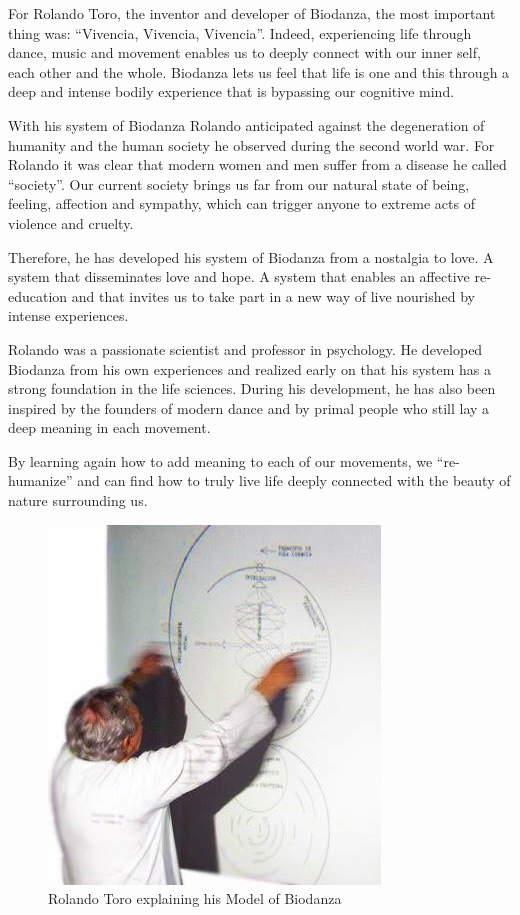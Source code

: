 \documentclass[
  11pt,
]{book}
\begin{document}
For Rolando Toro, the inventor and developer of Biodanza, the most important thing was: ``Vivencia, Vivencia, Vivencia''. Indeed, experiencing life through dance, music and movement enables us to deeply connect with our inner self, each other and the whole. Biodanza lets us feel that life is one and this through a deep and intense bodily experience that is bypassing our cognitive mind.

With his system of Biodanza Rolando anticipated against the degeneration of humanity and the human society he observed during the second world war. For Rolando it was clear that modern women and men suffer from a disease he called ``society''. Our current society brings us far from our natural state of being, feeling, affection and sympathy, which can trigger anyone to extreme acts of violence and cruelty.

Therefore, he has developed his system of Biodanza from a nostalgia to love. A system that disseminates love and hope. A system that enables an affective re-education and that invites us to take part in a new way of live nourished by intense experiences.

Rolando was a passionate scientist and professor in psychology. He developed Biodanza from his own experiences and realized early on that his system has a strong foundation in the life sciences. During his development, he has also been inspired by the founders of modern dance and by primal people who still lay a deep meaning in each movement.

By learning again how to add meaning to each of our movements, we ``re-humanize'' and can find how to truly live life deeply connected with the beauty of nature surrounding us.

\begin{figure}

{\centering \includegraphics[width=0.45\linewidth]{./figs/rolandoAndModel} 

}

\caption{Rolando Toro explaining his Model of Biodanza}\label{fig:rolandoModel}
\end{figure}
\end{document}
